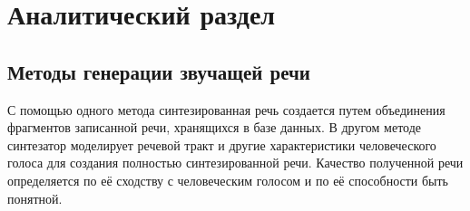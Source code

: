 \chapter{Аналитический раздел}

\section{Методы генерации звучащей речи}

С помощью одного метода синтезированная речь создается путем объединения фрагментов записанной речи, хранящихся в базе данных. 
В другом методе синтезатор моделирует речевой тракт и другие характеристики человеческого голоса для создания полностью синтезированной речи. 
Качество полученной речи определяется по её сходству с человеческим голосом и по её способности быть понятной.

